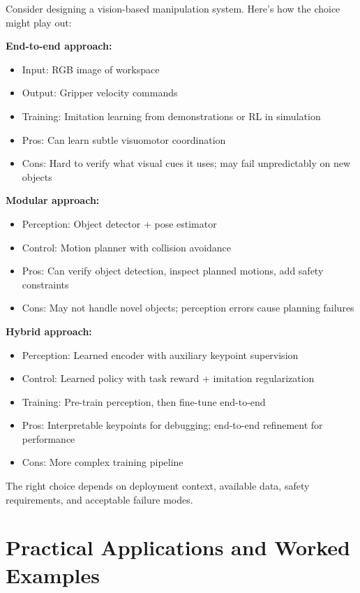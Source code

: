 Consider designing a vision-based manipulation system. Here's how the choice might play out:

\textbf{End-to-end approach:}
\begin{itemize}
    \item Input: RGB image of workspace
    \item Output: Gripper velocity commands
    \item Training: Imitation learning from demonstrations or RL in simulation
    \item Pros: Can learn subtle visuomotor coordination
    \item Cons: Hard to verify what visual cues it uses; may fail unpredictably on new objects
\end{itemize}

\textbf{Modular approach:}
\begin{itemize}
    \item Perception: Object detector + pose estimator
    \item Control: Motion planner with collision avoidance
    \item Pros: Can verify object detection, inspect planned motions, add safety constraints
    \item Cons: May not handle novel objects; perception errors cause planning failures
\end{itemize}

\textbf{Hybrid approach:}
\begin{itemize}
    \item Perception: Learned encoder with auxiliary keypoint supervision
    \item Control: Learned policy with task reward + imitation regularization
    \item Training: Pre-train perception, then fine-tune end-to-end
    \item Pros: Interpretable keypoints for debugging; end-to-end refinement for performance
    \item Cons: More complex training pipeline
\end{itemize}

The right choice depends on deployment context, available data, safety requirements, and acceptable failure modes.

\section{Practical Applications and Worked Examples}
\label{sec:practical_applications}

